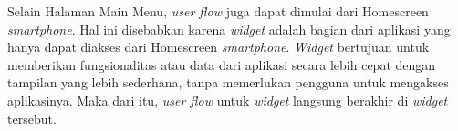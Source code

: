 Selain Halaman Main Menu, \textit{user flow} juga dapat dimulai dari Homescreen \textit{smartphone}. Hal ini disebabkan karena \textit{widget} adalah bagian dari aplikasi yang hanya dapat diakses dari Homescreen \textit{smartphone}. \textit{Widget} bertujuan untuk memberikan fungsionalitas atau data dari aplikasi secara lebih cepat dengan tampilan yang lebih sederhana, tanpa memerlukan pengguna untuk mengakses aplikasinya. Maka dari itu, \textit{user flow} untuk \textit{widget} langsung berakhir di \textit{widget} tersebut.
